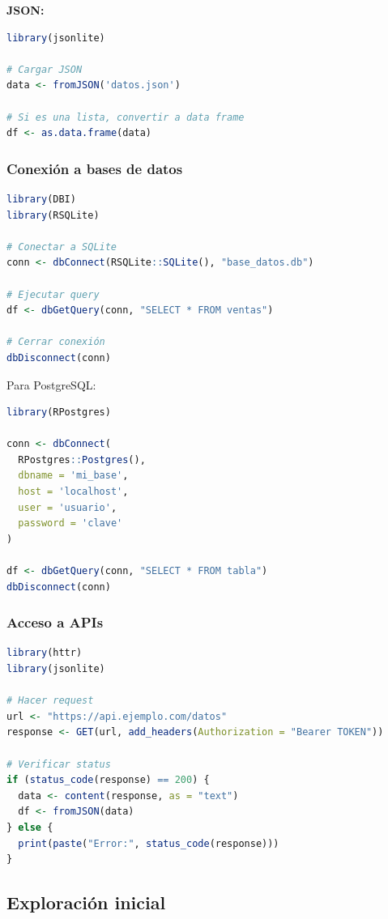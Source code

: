 \documentclass[a4paper,11pt]{article}
\begin{document}
\textbf{JSON:}
\begin{lstlisting}[language=R]
library(jsonlite)

# Cargar JSON
data <- fromJSON('datos.json')

# Si es una lista, convertir a data frame
df <- as.data.frame(data)
\end{lstlisting}

\subsubsection{Conexión a bases de datos}

\begin{lstlisting}[language=R]
library(DBI)
library(RSQLite)

# Conectar a SQLite
conn <- dbConnect(RSQLite::SQLite(), "base_datos.db")

# Ejecutar query
df <- dbGetQuery(conn, "SELECT * FROM ventas")

# Cerrar conexión
dbDisconnect(conn)
\end{lstlisting}

Para PostgreSQL:
\begin{lstlisting}[language=R]
library(RPostgres)

conn <- dbConnect(
  RPostgres::Postgres(),
  dbname = 'mi_base',
  host = 'localhost',
  user = 'usuario',
  password = 'clave'
)

df <- dbGetQuery(conn, "SELECT * FROM tabla")
dbDisconnect(conn)
\end{lstlisting}

\subsubsection{Acceso a APIs}

\begin{lstlisting}[language=R]
library(httr)
library(jsonlite)

# Hacer request
url <- "https://api.ejemplo.com/datos"
response <- GET(url, add_headers(Authorization = "Bearer TOKEN"))

# Verificar status
if (status_code(response) == 200) {
  data <- content(response, as = "text")
  df <- fromJSON(data)
} else {
  print(paste("Error:", status_code(response)))
}
\end{lstlisting}

\subsection{Exploración inicial}
\end{document}

